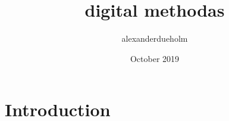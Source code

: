 \documentclass{article}
\title{digital methodas}
\author{alexanderdueholm }
\date{October 2019}
\begin{document}
\maketitle

\section{Introduction}
\end{document}
